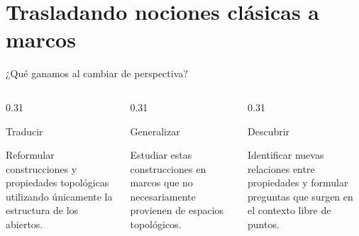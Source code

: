 \documentclass[compress,12pt]{beamer}
\begin{document}
\section{Trasladando nociones clásicas a marcos}
\begin{frame}[t]{¿Qué ganamos al cambiar de perspectiva?}

\small

\vspace{0.3cm}

\begin{columns}[T,onlytextwidth]

\begin{column}{0.31\textwidth}

\begin{block}{Traducir}

Reformular construcciones y propiedades
topológicas utilizando únicamente
la estructura de los abiertos.

\end{block}

\end{column}

\hfill

\begin{column}{0.31\textwidth}

\begin{block}{Generalizar}

Estudiar estas construcciones en marcos
que no necesariamente provienen
de espacios topológicos.

\end{block}

\end{column}

\hfill

\begin{column}{0.31\textwidth}

\begin{block}{Descubrir}

Identificar nuevas relaciones
entre propiedades y formular
preguntas que surgen en
el contexto libre de puntos.

\end{block}

\end{column}


\end{columns}
\end{frame}
\end{document}
